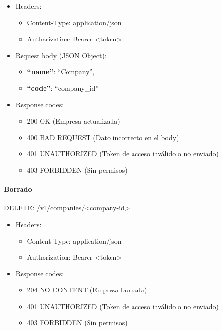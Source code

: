 \documentclass[12pt,a4paperpaper,]{report}
\providecommand{\tightlist}{%
  \setlength{\itemsep}{0pt}\setlength{\parskip}{0pt}}
\let\oldparagraph\paragraph
\renewcommand{\paragraph}[1]{\oldparagraph{#1}\mbox{}}
\begin{document}
\begin{itemize}
\tightlist
\item
  Headers:

  \begin{itemize}
  \tightlist
  \item
    Content-Type: application/json
  \item
    Authorization: Bearer \textless{}token\textgreater{}
  \end{itemize}
\item
  Request body (JSON Object):

  \begin{itemize}
  \tightlist
  \item
    \textbf{``name''}: ``Company'',
  \item
    \textbf{``code''}: ``company\_id''
  \end{itemize}
\item
  Response codes:

  \begin{itemize}
  \tightlist
  \item
    200 OK (Empresa actualizada)
  \item
    400 BAD REQUEST (Dato incorrecto en el body)
  \item
    401 UNAUTHORIZED (Token de acceso inválido o no enviado)
  \item
    403 FORBIDDEN (Sin permisos)
  \end{itemize}
\end{itemize}

\paragraph{Borrado}\label{borrado}

DELETE: /v1/companies/\textless{}company-id\textgreater{}

\begin{itemize}
\tightlist
\item
  Headers:

  \begin{itemize}
  \tightlist
  \item
    Content-Type: application/json
  \item
    Authorization: Bearer \textless{}token\textgreater{}
  \end{itemize}
\item
  Response codes:

  \begin{itemize}
  \tightlist
  \item
    204 NO CONTENT (Empresa borrada)
  \item
    401 UNAUTHORIZED (Token de acceso inválido o no enviado)
  \item
    403 FORBIDDEN (Sin permisos)
  \end{itemize}
\end{itemize}
\end{document}
